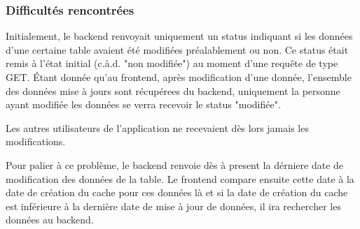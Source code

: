 \subsubsection{Difficultés rencontrées}
Initialement, le backend renvoyait uniquement un status indiquant si les données d'une certaine table avaient été modifiées préalablement ou non. 
Ce status était remis à l'état initial (c.à.d. "non modifiée") au moment d'une requête de type GET. Étant donnée qu'au frontend, après modification d'une donnée, l'ensemble des données mise à jours sont récupérees du backend, uniquement la personne ayant modifiée les données se verra recevoir le status "modifiée".

Les autres utilisateurs de l'application ne recevaient dès lors jamais les modifications.

Pour palier à ce problème, le backend renvoie dès à present la dérniere date de modification des données de la table. 
Le frontend compare ensuite cette date à la date de création du cache pour ces données là et si la date de création du cache est inférieure à la dernière date de mise à jour de données, il ira rechercher les données au backend.